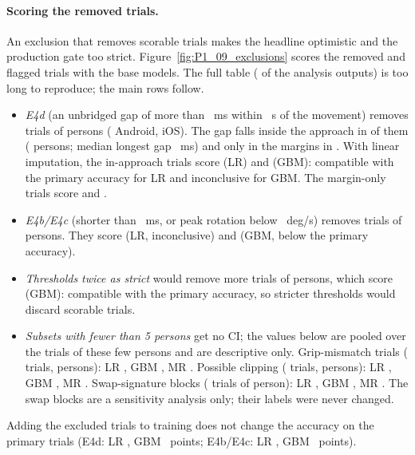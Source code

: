 \paragraph{Scoring the removed trials.} An exclusion that removes scorable trials makes the headline
optimistic and the production gate too strict. Figure~\ref{fig:P1_09_exclusions} scores the removed and
flagged trials with the base models. The full table ( of the analysis outputs)
is too long to reproduce; the main rows follow.
\begin{itemize}[nosep]
\item \emph{E4d} (an unbridged gap of more than ~ms within ~s of
  the movement) removes  trials of  persons ( Android,
   iOS). The gap falls inside the approach in  of them
  ( persons; median longest gap ~ms) and only in
  the margins in . With linear imputation, the in-approach trials score
   (LR) and  (GBM): compatible with the
  primary accuracy for LR and inconclusive for GBM. The margin-only trials score
   and .
\item \emph{E4b/E4c} (shorter than ~ms, or peak rotation below
  ~deg/s) removes  trials of 
  persons. They score  (LR, inconclusive) and  (GBM,
  below the primary accuracy).
\item \emph{Thresholds twice as strict} would remove  more trials of
   persons, which score  (GBM): compatible with
  the primary accuracy, so stricter thresholds would discard scorable trials.
\item \emph{Subsets with fewer than 5 persons} get no CI; the values below are pooled over the trials of
  these few persons and are descriptive only. Grip-mismatch trials
  ( trials,  persons): LR
  , GBM , MR
  . Possible clipping ( trials,
   persons): LR , GBM
  , MR . Swap-signature blocks
  ( trials of  person): LR , GBM
  , MR . The swap blocks are a sensitivity analysis only; their labels
  were never changed.
\end{itemize}
Adding the excluded trials to training does not change the accuracy on the primary trials (E4d: LR
, GBM ~points; E4b/E4c: LR ,
GBM ~points).


